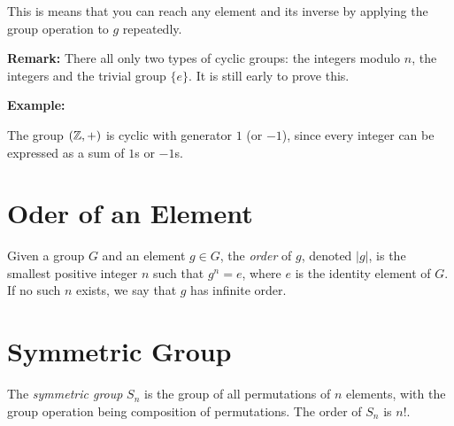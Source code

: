 This is means that you can reach any element and its inverse by applying the group operation to \(g\) repeatedly.

\textbf{Remark:} There all only two types of cyclic groups: the integers modulo \(n\), the integers and the trivial group \(\{e\}\).
It is still early to prove this.

\textbf{Example:}

The group \((\mathbb{Z}, +)\) is cyclic with generator \(1\) (or \(-1\)), since every integer can be expressed as a sum of \(1\)s or \(-1\)s.

\section{Oder of an Element}

Given a group \(G\) and an element \(g \in G\), the \emph{order} of \(g\), denoted \(|g|\), is the smallest positive integer \(n\) such that
\(g^n = e\), where \(e\) is the identity element of \(G\). If no such \(n\) exists,  we say that \(g\) has infinite order.

\section{Symmetric Group}

The \emph{symmetric group} \(S_n\) is the group of all permutations of \(n\) elements, with the group operation being composition of permutations.
The order of \(S_n\) is \(n!\).




